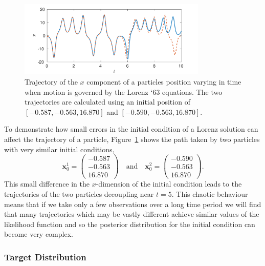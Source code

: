 \documentclass[final]{siamltex}
\begin{document}
\begin{figure}[htb]
\centering
\includegraphics[width=0.8\textwidth]{"figures/Lorenz_xtraj"}
\caption{Trajectory of the $x$ component of a particles position varying in time when motion is governed by the Lorenz `63 equations. The two trajectories are calculated using an initial position of $[-0.587,-0.563,16.870]$ and $[-0.590,-0.563,16.870]$.}
\label{fig:Lorenz_xtraj}
\end{figure}

To demonstrate how small errors in the initial condition of a Lorenz solution can affect the trajectory of a particle, Figure~\ref{fig:Lorenz_xtraj} shows the path taken by two particles with very similar initial conditions,
\[
	\mathbf{x}_0^1 = \begin{pmatrix} -0.587\\-0.563\\16.870 \end{pmatrix} \quad \text{and} \quad \mathbf{x}_0^2 = \begin{pmatrix} -0.590\\-0.563\\16.870 \end{pmatrix}.
\]
This small difference in the $x$-dimension of the initial condition leads to the trajectories of the two particles decoupling near $t=5$. This chaotic behaviour means that if we take only a few observations over a long time period we will find that many trajectories which may be vastly different achieve similar values of the likelihood function and so the posterior distribution for the initial condition can become very complex.%

\subsubsection{Target Distribution}\label{sec:lorenz_target}
\end{document}
